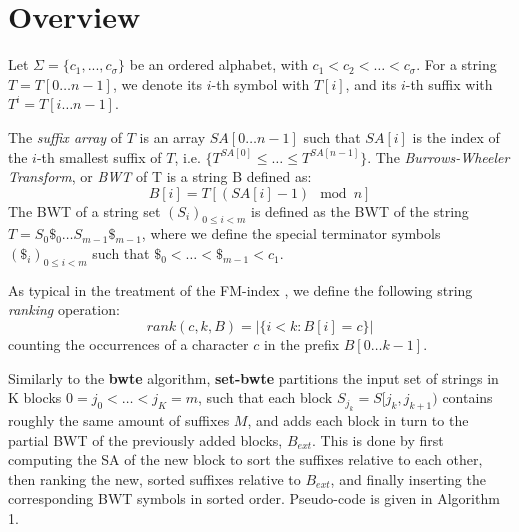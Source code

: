 \documentclass{acmsiggraph}
\begin{document}
\section{Overview}

Let $\Sigma = \{c_1, ..., c_\sigma\}$ be an ordered alphabet, with $c_1 < c_2 < \dots < c_\sigma$.
For a string $T = T[0 \dots n-1]$, we denote its $i$-th symbol with $T[i]$, and its $i$-th suffix with $T^i = T[i \dots n-1]$.

The \emph{suffix array} of $T$ is an array $SA[0 \dots n-1]$ such that $SA[i]$ is the index of the $i$-th smallest suffix of $T$, i.e. $\{ T^{SA[0]} \leq \dots \leq T^{SA[n-1]}\}$.
The \emph{Burrows-Wheeler Transform}, or \emph{BWT} of T is a string B defined as:
\begin{equation}
B[i] = T[ (SA[i] - 1) \mod n ]
\end{equation}
The BWT of a string set $(S_i)_{0 \leq i < m }$ is defined as the BWT of the string
$T = S_0 \$_0 \dots S_{m-1} \$_{m-1} $, where we define the special terminator symbols $(\$_i)_{0 \leq i < m }$ such that $\$_0 < \dots < \$_{m-1} < c_1$.

As typical in the treatment of the FM-index \cite{Ferragina:2005}, 
we define the following string \emph{ranking} operation:
\begin{equation}
rank(c,k,B) = |\{i < k : B[i] = c\}| 
\end{equation}
counting the occurrences of a character $c$ in the prefix $B[0 \dots k-1]$.

Similarly to the {\bf bwte} algorithm,
{\bf set-bwte} partitions the input
set of strings in K blocks ${0 = j_0 < \dots < j_K = m}$, such that each block $S_{j_k} = S[j_k, j_{k+1})$ contains roughly the same
amount of suffixes $M$, and adds each block in turn to the partial BWT of the previously added blocks, $B_{ext}$.
This is done by first computing the SA of the new block to sort the suffixes relative to each other, then ranking the new, sorted suffixes
relative to $B_{ext}$, and finally inserting the corresponding BWT symbols in sorted order.
Pseudo-code is given in Algorithm 1.
\end{document}
